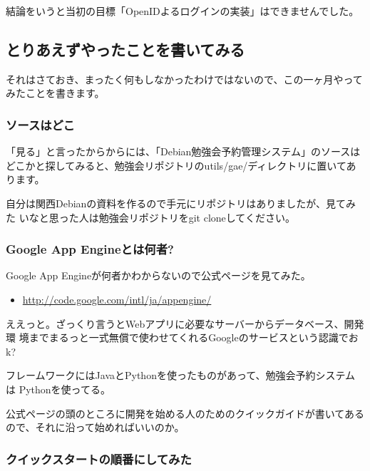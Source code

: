 \documentclass[mingoth,a4paper]{jsarticle}
\begin{document}
結論をいうと当初の目標「OpenIDよるログインの実装」はできませんでした。

\subsection{とりあえずやったことを書いてみる}

それはさておき、まったく何もしなかったわけではないので、この一ヶ月やって
みたことを書きます。

\subsubsection{ソースはどこ}

「見る」と言ったからからには、「Debian勉強会予約管理システム」のソースは
どこかと探してみると、勉強会リポジトリのutils/gae/ディレクトリに置いてあ
ります。

自分は関西Debianの資料を作るので手元にリポジトリはありましたが、見てみた
いなと思った人は勉強会リポジトリをgit cloneしてください。


\subsubsection{Google App Engineとは何者?}

Google App Engineが何者かわからないので公式ページを見てみた。

\begin{itemize}
 \item \url{http://code.google.com/intl/ja/appengine/}
\end{itemize}

ええっと。ざっくり言うとWebアプリに必要なサーバーからデータベース、開発環
境までまるっと一式無償で使わせてくれるGoogleのサービスという認識でおk?

フレームワークにはJavaとPythonを使ったものがあって、勉強会予約システムは
Pythonを使ってる。

公式ページの頭のところに開発を始める人のためのクイックガイドが書いてある
ので、それに沿って始めればいいのか。

\subsubsection{クイックスタートの順番にしてみた}
\end{document}

